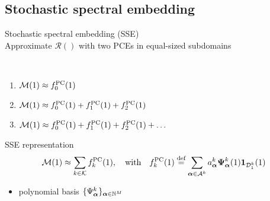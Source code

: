 \documentclass{rsuqbeamernew}
\newcommand{\BParams}{1}
\begin{document}
\subsection{Stochastic spectral embedding}
\begin{frame}[t]{Stochastic spectral embedding (SSE)}
	\small
	\\
	Approximate $\mathcal{R}()$ with two PCEs in {\altx equal-sized
	subdomains}\\
	\pause
	\begin{minipage}{0.65\linewidth}
		\\
		\begin{enumerate}
			\item $\cm(\BParams) \approx f_0^{\mathrm{PC}}(\BParams)$
			\item $\cm(\BParams) \approx 
			f_0^{\mathrm{PC}}(\BParams) + f_1^{\mathrm{PC}}(\BParams) + 
			f_2^{\mathrm{PC}}(\BParams)$
			\item $\cm(\BParams) \approx 
			f_0^{\mathrm{PC}}(\BParams) + f_1^{\mathrm{PC}}(\BParams) + 
			f_2^{\mathrm{PC}}(\BParams) + \dots$
		\end{enumerate}
	\end{minipage}
	\hfill
	\begin{minipage}{0.34\linewidth}
	\end{minipage}
	\pause
	\begin{block}{SSE representation}
		\begin{equation*}
		\cm(\BParams) \approx \sum_{k\in\ck}f_k^{\mathrm{PC}}(\BParams), \quad 
		\text{with} \quad f^{\mathrm{PC}}_k(\BParams) \eqdef 
\sum_{\ve{\alpha}\in\ca^k}a_{\ve{\alpha}}^k\ve{\Psi}_{\ve{\alpha}}^k(\BParams)
		\ve{1}_{\cd_{\BParams}^k}(\BParams)
		\end{equation*}
		
		\begin{itemize}
			\itemsep0.5em
			\item[] {\altx polynomial 
				basis} $\{\Psi^k_{\boldsymbol{\alpha}}\}_{\boldsymbol{\alpha}\in\mathbb{N}^M}$ 
				
		\end{itemize}
	\end{block}
\end{frame}
\end{document}
